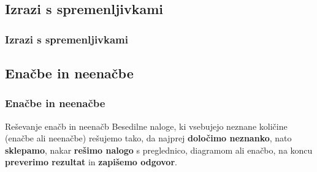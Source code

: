     \subsection{Izrazi s spremenljivkami}
        
        \begin{frame}[t]
            \frametitle{Izrazi s spremenljivkami}
        \end{frame}

    \subsection{Enačbe in neenačbe}
        
        \begin{frame}[t]
            \frametitle{Enačbe in neenačbe}

            \begin{alertblock}{Reševanje enačb in neenačb}
                Besedilne naloge, ki vsebujejo neznane količine (enačbe ali neenačbe) rešujemo tako, da najprej \textbf{določimo neznanko}, nato \textbf{sklepamo}, nakar \textbf{rešimo nalogo} s preglednico, diagramom ali enačbo, na koncu \textbf{preverimo rezultat} in \textbf{zapišemo odgovor}.
            \end{alertblock}
        \end{frame}

